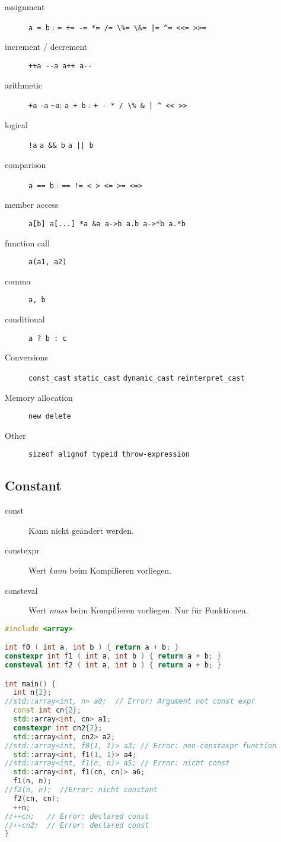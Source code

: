 \begin{description}
  \item[assignment] \lstinline|a = b| :
    \lstinline"= += -= *= /= \%= \&= |= ^= <<= >>="
  \item[increment / decrement] \lstinline|++a --a a++ a--|
  \item[arithmetic]
    \lstinline|+a| \lstinline|-a| \lstinline|~a|;
    \lstinline|a + b| :
    \lstinline"+ - * / \% & | ^ << >>"
  \item[logical]
    \lstinline|!a|
    \lstinline|a && b|
    \lstinline"a || b"
  \item[comparison] \lstinline|a == b| :
    \lstinline|== != < > <= >= <=>|
  \item[member access] \lstinline|a[b] a[...] *a &a a->b a.b a->*b a.*b|
  \item[function call] \lstinline|a(a1, a2)|
  \item[comma] \lstinline|a, b|
  \item[conditional] \lstinline|a ? b : c|
  \item[Conversions] \lstinline|const_cast| \lstinline|static_cast|
    \lstinline|dynamic_cast| \lstinline|reinterpret_cast|
  \item[Memory allocation] \lstinline|new delete|
  \item[Other] \lstinline|sizeof alignof typeid throw-expression|
\end{description}

\subsection{Constant}
\label{sec:Ausdruck:constant}

\begin{description}
  \item[const] Kann nicht geändert werden.
  \item[constexpr] Wert \emph{kann} beim Kompilieren vorliegen.
  \item[consteval] Wert \emph{muss} beim Kompilieren vorliegen. Nur für Funktionen.
\end{description}

\begin{lstlisting}[language=C++]
#include <array>

int f0 ( int a, int b ) { return a + b; }
constexpr int f1 ( int a, int b ) { return a + b; }
consteval int f2 ( int a, int b ) { return a + b; }

int main() {
  int n{2};
//std::array<int, n> a0;  // Error: Argument not const expr
  const int cn{2};
  std::array<int, cn> a1;
  constexpr int cn2{2};
  std::array<int, cn2> a2;
//std::array<int, f0(1, 1)> a3; // Error: non-constexpr function
  std::array<int, f1(1, 1)> a4;
//std::array<int, f1(n, n)> a5; // Error: nicht const
  std::array<int, f1(cn, cn)> a6;
  f1(n, n);
//f2(n, n);  //Error: nicht constant
  f2(cn, cn);
  ++n;
//++cn;   // Error: declared const
//++cn2;  // Error: declared const
}
\end{lstlisting}

